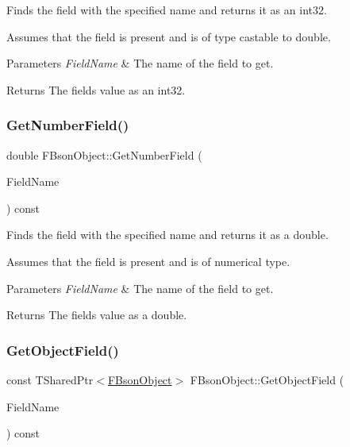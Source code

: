 Finds the field with the specified name and returns it as an int32.

Assumes that the field is present and is of type castable to double.


\begin{DoxyParams}{Parameters}
{\em Field\+Name} & The name of the field to get. \\
\hline
\end{DoxyParams}
\begin{DoxyReturn}{Returns}
The field\textquotesingle{}s value as an int32. 
\end{DoxyReturn}
\mbox{\label{class_f_bson_object_ac2eb24afb362e7adeffd25295926e309}} 
\subsubsection{\texorpdfstring{Get\+Number\+Field()}{GetNumberField()}}
{\footnotesize\ttfamily double F\+Bson\+Object\+::\+Get\+Number\+Field (\begin{DoxyParamCaption}\item[{const F\+String \&}]{Field\+Name }\end{DoxyParamCaption}) const}

Finds the field with the specified name and returns it as a double.

Assumes that the field is present and is of numerical type.


\begin{DoxyParams}{Parameters}
{\em Field\+Name} & The name of the field to get. \\
\hline
\end{DoxyParams}
\begin{DoxyReturn}{Returns}
The field\textquotesingle{}s value as a double. 
\end{DoxyReturn}
\mbox{\label{class_f_bson_object_aa803b297d9bdacfca1b7569c3f53d1f4}} 
\subsubsection{\texorpdfstring{Get\+Object\+Field()}{GetObjectField()}}
{\footnotesize\ttfamily const T\+Shared\+Ptr$<$\mbox{\hyperlink{class_f_bson_object}{F\+Bson\+Object}}$>$ F\+Bson\+Object\+::\+Get\+Object\+Field (\begin{DoxyParamCaption}\item[{const F\+String \&}]{Field\+Name }\end{DoxyParamCaption}) const}

